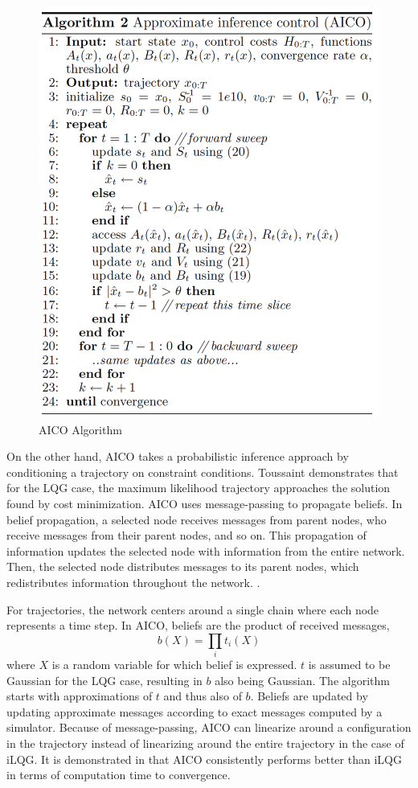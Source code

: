 \documentclass[11pt]{article}
\begin{document}
            \begin{figure}
                \centering
                \includegraphics[width=0.45\linewidth]{images/algorithms/aico.png}
                \caption{AICO Algorithm \protect\cite{toussaint_robot_2009}}
                \label{fig:aico}
            \end{figure}

            \par On the other hand, AICO takes a probabilistic inference approach by conditioning a trajectory on constraint conditions. Toussaint demonstrates that for the LQG case, the maximum likelihood trajectory approaches the solution found by cost minimization. AICO uses message-passing to propagate beliefs. In belief propagation, a selected node receives messages from parent nodes, who receive messages from their parent nodes, and so on. This propagation of information updates the selected node with information from the entire network. Then, the selected node distributes messages to its parent nodes, which redistributes information throughout the network. \cite{minka_expectation_nodate}.
            \par For trajectories, the network centers around a single chain where each node represents a time step. In AICO, beliefs are the product of received messages,
            \begin{equation}
                b(X)=\prod_{i}t_{i}(X)
            \end{equation}
            where $X$ is a random variable for which belief is expressed. $t$ is assumed to be Gaussian for the LQG case, resulting in $b$ also being Gaussian. The algorithm starts with approximations of $t$ and thus also of $b$. Beliefs are updated by updating approximate messages according to exact messages computed by a simulator.
            Because of message-passing, AICO can linearize around a configuration in the trajectory instead of linearizing around the entire trajectory in the case of iLQG.\cite{toussaint_robot_2009} It is demonstrated in \cite{toussaint_robot_2009} that AICO consistently performs better than iLQG in terms of computation time to convergence.
\end{document}
